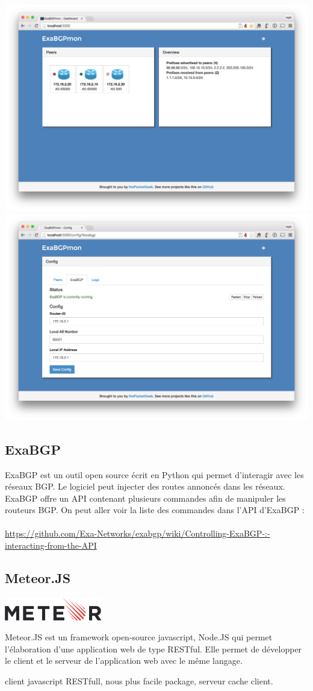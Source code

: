 \includegraphics[scale = 0.40]{img/exabgpmon.png}
\includegraphics[scale = 0.40]{img/exabgpmon2.png}

\subsection{ExaBGP}
ExaBGP est un outil open source écrit en Python qui permet d'interagir avec les réseaux BGP. Le logiciel peut injecter des routes annoncés dans les réseaux. 
ExaBGP offre un API contenant plusieurs commandes afin de manipuler les routeurs BGP. On peut aller voir la liste des commandes dans l'API d'ExaBGP : 
\\
\\
\url{https://github.com/Exa-Networks/exabgp/wiki/Controlling-ExaBGP-:-interacting-from-the-API}

\subsection{Meteor.JS \cite{Meteor.JS}}
\begin{center}
\includegraphics[height=1cm]{img/Meteor-logo.png}
\end{center}

Meteor.JS est un framework open-source javascript, Node.JS qui permet l'élaboration d'une application web de type RESTful. Elle permet de développer le client et le serveur de l'application web avec le même langage.  

client javascript RESTfull, nous plus facile package, serveur cache client.

